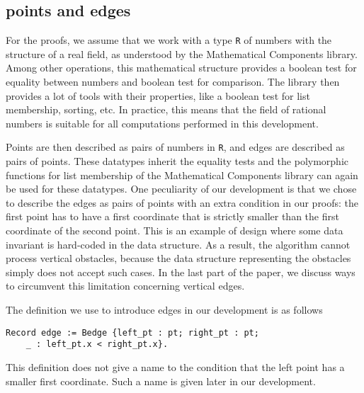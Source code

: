\documentclass[a4paper, USenglish, cleveref, autoref, thm-restate, final]{lipics-v2021}
\begin{document}
\subsection{points and edges}

For the proofs, we assume that we work with a type {\tt R} of numbers
with the structure of a real field, as understood by the
{\sc Mathematical Components} library.  Among other operations, this
mathematical structure provides a boolean test for equality between
numbers and boolean test for comparison.  The library then provides a
lot of tools with their properties, like a boolean test for list
membership, sorting, etc.  In practice, this means that
the field of rational numbers is suitable for all computations
performed in this development.

Points are then described as pairs of numbers in {\tt R}, and edges
are described as pairs of points.  These datatypes inherit the
equality tests and the polymorphic functions for list membership of
the {\sc Mathematical Components} library can again be used for these
datatypes.  One peculiarity of our development
is that we chose to describe the edges as pairs of points with an extra
condition in our proofs: the first point has to have a first
coordinate that is strictly smaller than the first coordinate of the
second point.  This is an example of design where some data invariant
is hard-coded in the data structure.  As a result, the algorithm
cannot process vertical obstacles, because the data structure
representing the obstacles simply does not accept such cases.  In the
last part of the paper, we discuss ways to circumvent this limitation
concerning vertical edges.

The definition we use to introduce edges in our development is as
follows
\begin{verbatim}
Record edge := Bedge {left_pt : pt; right_pt : pt;
    _ : left_pt.x < right_pt.x}.
\end{verbatim}
This definition does not give a name to the condition that the left
point has a smaller first coordinate. Such a name is given later in
our development.
\end{document}
